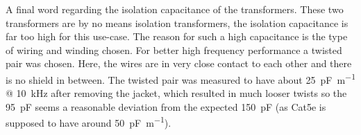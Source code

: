 \documentclass[12pt]{book}
\begin{document}
A final word regarding the isolation capacitance of the transformers. These two transformers are by no means isolation transformers, the isolation capacitance is far too high for this use-case. The reason for such a high capacitance is the type of wiring and winding chosen. For better high frequency performance a twisted pair was chosen. Here, the wires are in very close contact to each other and there is no shield in between. The twisted pair was measured to have about \qty{25}{\pF \per \meter} @ \qty{10}{\kHz} after removing the jacket, which resulted in much looser twists so the \qty{95}{\pF} seems a reasonable deviation from the expected \qty{150}{\pF} (as Cat5e is supposed to have around \qty{50}{\pF \per \m}).
\end{document}
